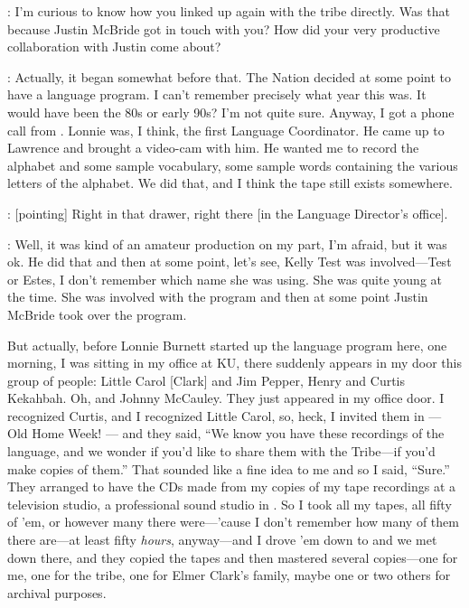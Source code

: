 \documentclass[output=paper]{LSP/langsci}
\begin{document}
: I'm curious to know how you linked up again with the  tribe directly. Was that because Justin McBride got in touch with you? How did your very productive collaboration with Justin come about?

: Actually, it began somewhat before that. The  Nation decided at some point to have a language program. I can't remember precisely what year this was. It would have been the 80s or early 90s? I'm not quite sure. Anyway, I got a phone call from . Lonnie was, I think, the first Language Coordinator. He came up to Lawrence and brought a video-cam with him. He wanted me to record the alphabet and some sample vocabulary, some sample words containing the various letters of the  alphabet. We did that, and I think the tape still exists somewhere.

: [pointing] Right in that drawer, right there [in the Language Director's office].

: Well, it was kind of an amateur production on my part, I'm afraid, but it was ok. He did that and then at some point, let's see, Kelly Test was involved---Test or Estes, I don't remember which name she was using. She was quite young at the time. She was involved with the program and then at some point Justin McBride took over the program. 

But actually, before Lonnie Burnett started up the language program here, one morning, I was sitting in my office at KU, there suddenly appears in my door this group of people: Little Carol [Clark] and Jim Pepper, Henry and Curtis Kekahbah. Oh, and Johnny McCauley. They just appeared in my office door. I recognized Curtis, and I recognized Little Carol, so, heck, I invited them in --- Old Home Week! --- and they said, ``We know you have these recordings of the  language, and we wonder if you'd like to share them with the Tribe---if you'd make copies of them.'' That sounded like a fine idea to me and so I said, ``Sure.'' They arranged to have the CDs made from my copies of my tape recordings at a television studio, a professional sound studio in . So I took all my tapes, all fifty of 'em, or however many there were---'cause I don't remember how many of them there are---at least fifty \textit{hours}, anyway---and I drove 'em down to  and we met down there, and they copied the tapes and then mastered several copies---one for me, one for the tribe, one for Elmer Clark's family, maybe one or two others for archival purposes. 
\end{document}

